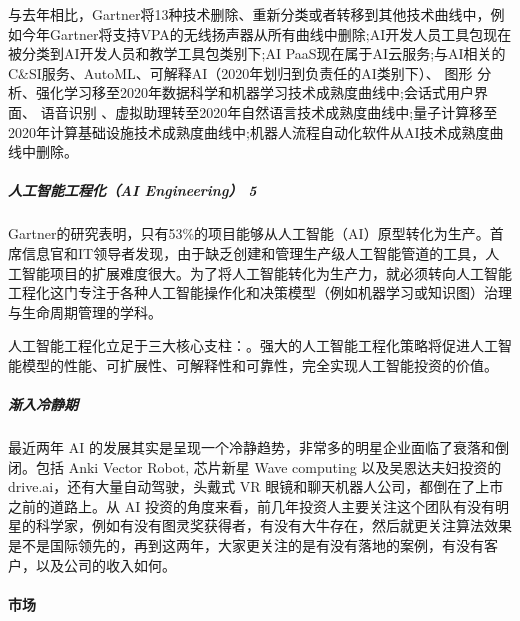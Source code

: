 \documentclass[letterpaper,10pt,english]{sphinxmanual}
\begin{document}
与去年相比，Gartner将13种技术删除、重新分类或者转移到其他技术曲线中，例如今年Gartner将支持VPA的无线扬声器从所有曲线中删除;AI开发人员工具包现在被分类到AI开发人员和教学工具包类别下;AI
PaaS现在属于AI云服务;与AI相关的C\&SI服务、AutoML、可解释AI（2020年划归到负责任的AI类别下）、
图形
分析、强化学习移至2020年数据科学和机器学习技术成熟度曲线中;会话式用户界面、
语音识别
、虚拟助理转至2020年自然语言技术成熟度曲线中;量子计算移至2020年计算基础设施技术成熟度曲线中;机器人流程自动化软件从AI技术成熟度曲线中删除。


\subparagraph{人工智能工程化（AI Engineering） 5\sphinxfootnotemark[710]}
\label{\detokenize{chapter_project/AI_industry_analysis:ai-engineering-5}}%
\begin{footnotetext}[710]\sphinxAtStartFootnote
{}
%
\end{footnotetext}\ignorespaces 
Gartner的研究表明，只有53\%的项目能够从人工智能（AI）原型转化为生产。首席信息官和IT领导者发现，由于缺乏创建和管理生产级人工智能管道的工具，人工智能项目的扩展难度很大。为了将人工智能转化为生产力，就必须转向人工智能工程化这门专注于各种人工智能操作化和决策模型（例如机器学习或知识图）治理与生命周期管理的学科。

人工智能工程化立足于三大核心支柱：。强大的人工智能工程化策略将促进人工智能模型的性能、可扩展性、可解释性和可靠性，完全实现人工智能投资的价值。


\subparagraph{渐入冷静期}
\label{\detokenize{chapter_project/AI_industry_analysis:id3}}
最近两年 AI
的发展其实是呈现一个冷静趋势，非常多的明星企业面临了衰落和倒闭。包括
Anki Vector Robot, 芯片新星 Wave computing 以及吴恩达夫妇投资的
drive.ai，还有大量自动驾驶，头戴式 VR
眼镜和聊天机器人公司，都倒在了上市之前的道路上。从 AI
投资的角度来看，前几年投资人主要关注这个团队有没有明星的科学家，例如有没有图灵奖获得者，有没有大牛存在，然后就更关注算法效果是不是国际领先的，再到这两年，大家更关注的是有没有落地的案例，有没有客户，以及公司的收入如何。%
\begin{footnote}[711]\sphinxAtStartFootnote
{}
%
\end{footnote}


\paragraph{市场}
\label{\detokenize{chapter_project/AI_industry_analysis:id4}}
\end{document}
